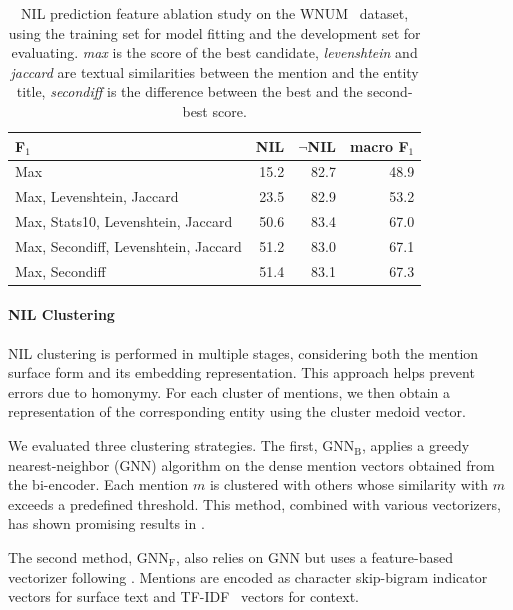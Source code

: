 \begin{table}
    \centering
\begin{tabular}{lrrr}
\toprule
F$_1$ &  NIL &  $\neg$NIL &  macro F$_1$  \\

\midrule
Max                               &  15.2 &  82.7 &          48.9 \\
Max, Levenshtein, Jaccard           &  23.5 &  82.9 &          53.2 \\
Max, Stats10, Levenshtein, Jaccard   &  50.6 &  83.4 &          67.0 \\
Max, Secondiff, Levenshtein, Jaccard &  51.2 &  83.0 &          67.1 \\
Max, Secondiff                     &  51.4 &  83.1 &          67.3 \\
\bottomrule
\end{tabular}
    \caption[NIL prediction feature ablation study.]{NIL prediction feature ablation study on the WNUM~\cite{Onoe_Durrett_2020} dataset, using the training set for model fitting and the development set for evaluating. \textit{max} is the score of the best candidate, \textit{levenshtein} and \textit{jaccard} are textual similarities between the mention and the entity title, \textit{secondiff} is the difference between the best and the second-best score.}
    \label{tab:feature_ablation_study}
\end{table}

\paragraph{NIL Clustering} NIL clustering is performed in multiple stages, considering both the mention surface form and its embedding representation. This approach helps prevent errors due to homonymy. For each cluster of mentions, we then obtain a representation of the corresponding entity using the cluster medoid vector.

We evaluated three clustering strategies. The first, \textit{$\text{GNN}_\text{B}$}, applies a greedy nearest-neighbor (GNN) algorithm on the dense mention vectors obtained from the bi-encoder. Each mention $m$ is clustered with others whose similarity with $m$ exceeds a predefined threshold. This method, combined with various vectorizers, has shown promising results in \textcite{streaming_crossdoc_coreference}.

The second method, \textit{$\text{GNN}_\text{F}$}, also relies on GNN but uses a feature-based vectorizer following \textcite{shrimpton-etal-2015-sampling}. Mentions are encoded as character skip-bigram indicator vectors for surface text and TF-IDF~\cite{jm3} vectors for context.

